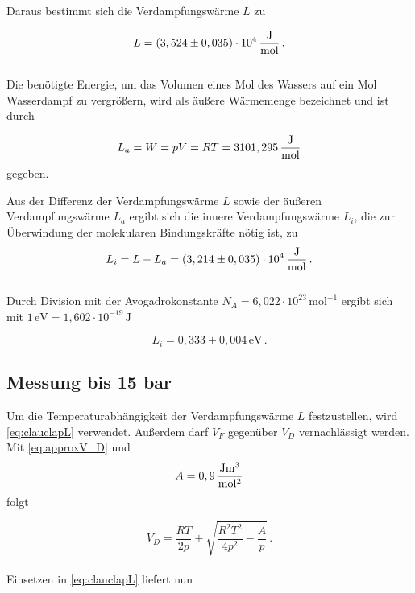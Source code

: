 Daraus bestimmt sich die Verdampfungswärme $L$ zu

\begin{equation*}
  L = (3,524 \pm 0,035) \cdot 10^4 \,\unit{\frac{\joule}{\mol}} \,.
\end{equation*} \\

Die benötigte Energie, um das Volumen eines Mol des Wassers auf ein Mol Wasserdampf zu vergrößern, wird
als äußere Wärmemenge bezeichnet und ist durch

\begin{equation*}
  L_a = W = pV = RT = 3101,295 \,\unit{\frac{\joule}{\mol}}
  \label{eq:äußereVW}
\end{equation*} gegeben.

Aus der Differenz der Verdampfungswärme $L$ sowie der äußeren Verdampfungswärme $L_a$ ergibt sich die
innere Verdampfungswärme $L_i$, die zur Überwindung der molekularen Bindungskräfte nötig ist, zu 
\begin{equation*}
  L_i = L - L_a = (3,214 \pm 0,035) \cdot 10^4 \,\unit{\frac{\joule}{\mol}} \,.
  \label{eq:innereVW}
\end{equation*} \\

Durch Division mit der Avogadrokonstante $N_A = 6,022 \cdot 10^{23} \,\unit{\mol}^{-1}$ ergibt sich
mit $1 \,\unit{\electronvolt} = 1,602 \cdot 10^{-19} \,\unit{\joule}$

\begin{equation*}
  L_i = 0,333 \pm 0,004 \,\unit{\electronvolt} \,.
\end{equation*}

\subsection{Messung bis 15 bar}
Um die Temperaturabhängigkeit der Verdampfungswärme $L$ festzustellen, wird \eqref{eq:clauclapL} verwendet.
Außerdem darf $V_F$ gegenüber $V_D$ vernachlässigt werden.
Mit \eqref{eq:approxV_D} und 
\begin{equation*}
  A = 0,9 \,\unit{\frac{\joule\cubic\meter}{\square\mol}}
\end{equation*} folgt

\begin{equation*}
  V_D = \frac{RT}{2p} \pm \sqrt{\frac{R^2 T^2}{4 p^2} - \frac{A}{p}}\,.
\end{equation*} \\

Einsetzen in \eqref{eq:clauclapL} liefert nun


